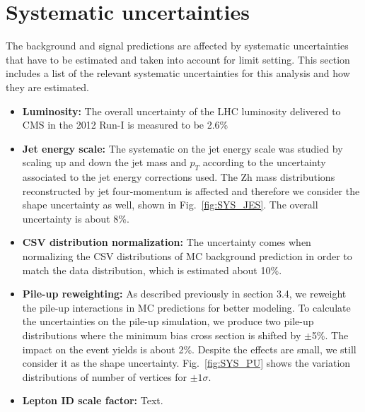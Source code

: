 
\section{Systematic uncertainties}
The background and signal predictions are affected by systematic uncertainties that have to be estimated and taken into account for limit setting. This section includes a list of the relevant systematic uncertainties for this analysis and how they are estimated.

\begin{itemize}
\item \textbf{Luminosity:} The overall uncertainty of the LHC luminosity delivered to CMS in the 2012 Run-I is measured to be 2.6\%\cite{lumi}
\item \textbf{Jet energy scale:} The systematic on the jet energy scale was studied by scaling up and down the jet mass and $p_{T}$ according to the uncertainty associated to the jet energy corrections used. The Zh mass distributions reconstructed by jet four-momentum is affected and therefore we consider the shape uncertainty as well, shown in Fig.~\ref{fig:SYS_JES}. The overall uncertainty is about 8\%.
\item \textbf{CSV distribution normalization:} The uncertainty comes when normalizing the CSV distributions of MC background prediction in order to match the data distribution, which is estimated about 10\%.
\item \textbf{Pile-up reweighting:} As described previously in section 3.4, we reweight the pile-up interactions in MC predictions for better modeling. To calculate the uncertainties on the pile-up simulation, we produce two pile-up distributions where the minimum bias cross section is shifted by $\pm$5\%\cite{PileupError}. The impact on the event yields is about 2\%. Despite the effects are small, we still consider it as the shape uncertainty. Fig.~\ref{fig:SYS_PU} shows the variation distributions of number of vertices for $\pm1\sigma$.
\item \textbf{Lepton ID scale factor:} Text.
\end{itemize}

